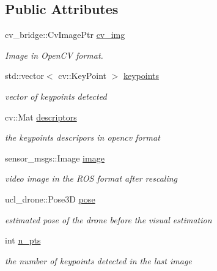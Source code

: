 \subsection*{Public Attributes}
\begin{DoxyCompactItemize}
\item 
\mbox{\label{classProcessedImage_ade3b1abb2a76c250890f7f47526a4982}} 
cv\+\_\+bridge\+::\+Cv\+Image\+Ptr \hyperlink{classProcessedImage_ade3b1abb2a76c250890f7f47526a4982}{cv\+\_\+img}
\begin{DoxyCompactList}\small\item\em Image in Open\+CV format. \end{DoxyCompactList}\item 
\mbox{\label{classProcessedImage_a0b24f5980f7c260d38ac056f355401e4}} 
std\+::vector$<$ cv\+::\+Key\+Point $>$ \hyperlink{classProcessedImage_a0b24f5980f7c260d38ac056f355401e4}{keypoints}
\begin{DoxyCompactList}\small\item\em vector of keypoints detected \end{DoxyCompactList}\item 
\mbox{\label{classProcessedImage_a2cd78d795c267711680681c61d361017}} 
cv\+::\+Mat \hyperlink{classProcessedImage_a2cd78d795c267711680681c61d361017}{descriptors}
\begin{DoxyCompactList}\small\item\em the keypoints descripors in opencv format \end{DoxyCompactList}\item 
\mbox{\label{classProcessedImage_ac97dd98356dbb3ac9d761d5d26e1169a}} 
sensor\+\_\+msgs\+::\+Image \hyperlink{classProcessedImage_ac97dd98356dbb3ac9d761d5d26e1169a}{image}
\begin{DoxyCompactList}\small\item\em video image in the R\+OS format after rescaling \end{DoxyCompactList}\item 
\mbox{\label{classProcessedImage_a2297493e85206abec15dc01ad467142f}} 
ucl\+\_\+drone\+::\+Pose3D \hyperlink{classProcessedImage_a2297493e85206abec15dc01ad467142f}{pose}
\begin{DoxyCompactList}\small\item\em estimated pose of the drone before the visual estimation \end{DoxyCompactList}\item 
\mbox{\label{classProcessedImage_a6030bdbeefb071b139739c8977a48bba}} 
int \hyperlink{classProcessedImage_a6030bdbeefb071b139739c8977a48bba}{n\+\_\+pts}
\begin{DoxyCompactList}\small\item\em the number of keypoints detected in the last image \end{DoxyCompactList}\end{DoxyCompactItemize}
